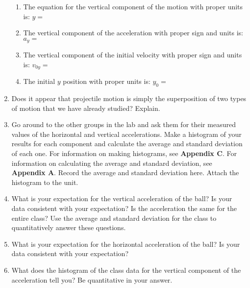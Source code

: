 \begin{enumerate}
\begin{enumerate}
\item The equation for the vertical component of the motion with proper units is:
$y =$\vspace{5mm}

\item The vertical component of the acceleration with proper sign and units is: 
\( a_{y}= \)
\vspace{5mm}

\item The vertical component of the initial velocity with proper sign and units is:
\( v_{0y}= \) \vspace{5mm}

\item The initial $y$ position with proper units is: \( y_{0} =\) \vspace{5mm}

\end{enumerate}

\item Does it appear that projectile motion is simply the superposition of two
types of motion that we have already studied? Explain.
\vspace{20mm}

\item Go around to the other groups in the lab and ask them for their measured values of the horizontal and vertical accelerations.
Make a histogram of your results for each component and calculate the average and standard deviation of each one.
For information on making histograms, see \textbf{Appendix C}. For information on calculating the average and
standard deviation, see \textbf{Appendix A}. Record the average and standard deviation here.
Attach the histogram to the unit.
\vspace{20mm}

\item What is your expectation for the vertical acceleration of the ball? Is your data consistent with your expectation?
Is the acceleration the same for the entire class? 
Use the average and standard deviation for the class to quantitatively answer these questions.
\vspace{20mm}

\item What is your expectation for the horizontal acceleration of the ball?  Is your data consistent with your expectation?
\vspace{20mm}

\item What does the histogram of the class data for the vertical component of the acceleration tell you? Be quantitative in your answer.
\vspace{20mm}

\end{enumerate}

